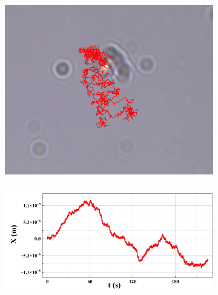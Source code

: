 \documentclass[a4paper]{report} %
\begin{document}
\begin{figure}[H]
    \begin{subfigure}{0.3\textwidth}
        \includegraphics[width=\linewidth]{image3.png}
    \end{subfigure}
    \begin{subfigure}{0.6\textwidth}
        \includegraphics[width=\linewidth]{image4.png}
    \end{subfigure}


\end{figure}
\end{document}
